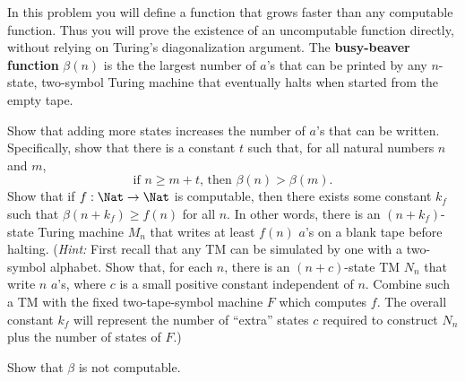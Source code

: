 \documentclass[ps, letterpaper]{cs121}
\begin{document}
In this problem you will define a function that grows faster than any computable function. Thus you will prove the existence of an uncomputable function directly, without relying on Turing's diagonalization argument. 
The {\bf busy-beaver function}
$\beta(n)$ is the
the largest number of $a$'s that can be printed by any $n$-state, two-symbol Turing machine that eventually halts when started from the empty tape.
\iffalse Formally, for each $n \in \Nat$, $\beta(n)$ is defined to be the largest $m$
such that, for some
one-tape Turing machine $M$ with alphabet $\{\sqcup, a\}$
and with exactly $n$
states,
$$(s,\triangleright \underline{\sqcup}) \vdash_M^*
  (h,\triangleright \underline{\sqcup} a^m).$$
\fi
  \subproblem
  Show that adding more states increases the number of $a$'s that can be
  written. Specifically, show that there is a constant $t$ such that, for all natural numbers $n$ and
  $m$,
  $$ \mbox{if } n \geq m +t \mbox{, then } \beta(n) > \beta(m).$$
  \vskip-4pt
  \subproblem
  Show that if $f:\Nat\rightarrow\Nat$ is computable, then there exists
  some constant $k_f$ such that
  $\beta(n+k_f)\geq f(n)$
  for all $n$.  In other words, there is an $(n+k_f)$-state Turing machine $M_n$
  that writes at least $f(n)$ $a$'s on a blank tape before
  halting.  ({\it Hint:}  First recall that any TM can be simulated by one with a two-symbol alphabet. Show that, for each $n$, there is an $(n+c)$-state TM
  $N_n$ that write $n$ $a$'s, where $c$ is
  a small positive constant independent of $n$.  Combine
  such a TM with the fixed two-tape-symbol machine $F$ which computes $f$.  The overall constant $k_f$ will represent
  the number of ``extra'' states $c$ required to construct $N_n$ plus
  the number of states of $F$.)
  \vskip4pt

  \subproblem
  Show that $\beta$ is not computable.  \iffalse For purposes of this problem, you may assume the
  following lemma: Any recursive function from numbers to numbers is
  computed by some Turing machine with alphabet $\{\sqcup,a \}$.\fi
\end{document}
